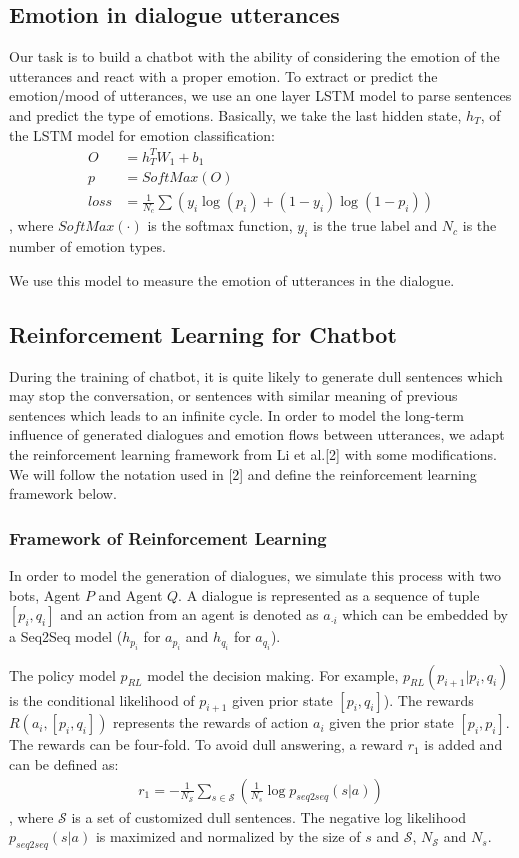 \documentclass{article}
\begin{document}
\subsection{Emotion in dialogue utterances}
Our task is to build a chatbot with the ability of considering the emotion of the utterances and react with a proper emotion. To extract or predict the emotion/mood of utterances, we use an one layer LSTM model to parse sentences and predict the type of emotions. Basically, we take the last hidden state, $h_T$, of the LSTM model for emotion classification:
\begin{align*}
O &= h_T^TW_1 + b_1\\
p &= SoftMax(O)\\
loss &= \frac{1}{N_{c}}\sum (y_i\log(p_i) + (1-y_i)\log(1 - p_i))
\end{align*}
, where $SoftMax(\cdot)$ is the softmax function, $y_i$ is the true label and $N_c$ is the number of emotion types.

We use this model to measure the emotion of utterances in the dialogue.

\subsection{Reinforcement Learning for Chatbot}
During the training of chatbot, it is quite likely to generate dull sentences which may stop the conversation, or sentences with similar meaning of previous sentences which leads to an infinite cycle. In order to model the long-term influence of generated dialogues and emotion flows between utterances, we adapt the reinforcement learning framework from Li et al.[2] with some modifications. We will follow the notation used in [2] and define the reinforcement learning framework below.

\subsubsection{Framework of Reinforcement Learning}
In order to model the generation of dialogues, we simulate this process with two bots, Agent $P$ and Agent $Q$. A dialogue is represented as a sequence of tuple $[p_i, q_i]$ and an action from an agent is denoted as $a_{\cdot i}$ which can be embedded by a Seq2Seq model ($h_{p_i}$ for $a_{p_i}$ and $h_{q_i}$ for $a_{q_i}$).

The policy model $p_{RL}$ model the decision making. For example, $p_{RL}(p_{i+1} | p_i, q_i)$ is the conditional likelihood of $p_{i+1}$ given prior state $[p_i, q_i]$). The rewards $R(a_i, [p_i, q_i])$ represents the rewards of action $a_i$ given the prior state $[p_i, p_i]$. The rewards can be four-fold. To avoid dull answering, a reward $r_1$ is added and can be defined as:
\begin{align*}
r_1 = - \frac{1}{N_{\mathcal{S}}} \sum_{s \in \mathcal{S}}(\frac{1}{N_s} \log p_{seq2seq}(s|a))
\end{align*}
, where $\mathcal{S}$ is a set of customized dull sentences. The negative log likelihood $p_{seq2seq}(s|a)$ is maximized and normalized by the size of $s$ and $\mathcal{S}$, $N_{\mathcal{S}}$ and $N_{s}$.
\end{document}
